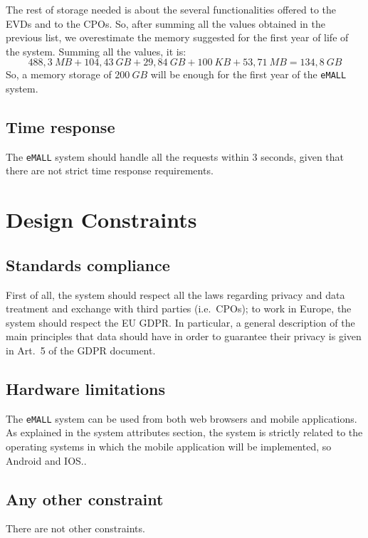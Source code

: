 The rest of storage needed is about the several functionalities offered to the EVDs and to the CPOs.
So, after summing all the values obtained in the previous list, we overestimate the memory suggested for the first year
of life of the system.
Summing all the values, it is:
\[
    488,3\ MB + 104,43\ GB + 29,84\ GB + 100\ KB + 53,71\ MB = 134,8\ GB
\]
So, a memory storage of $200\ GB$ will be enough for the first year of the \verb|eMALL| system.

\subsection*{Time response}
The \verb|eMALL| system should handle all the requests within 3 seconds, given that there are not strict time response requirements.

\newpage


\section{Design Constraints}
\label{sec:design_constraints}%

\subsection{Standards compliance}
\label{subsec:standards_compliance}%
First of all, the system should respect all the laws regarding privacy and data treatment and exchange with third parties (i.e.\ CPOs);
to work in Europe, the system should respect the EU GDPR\@.
In particular, a general description of the main principles that data should have in order to guarantee their privacy
is given in Art.\ 5 of the GDPR document.

\subsection{Hardware limitations}
\label{subsec:hardware_limitations}%
The \verb|eMALL| system can be used from both web browsers and mobile applications.
As explained in the system attributes section, the system is strictly related to the operating systems
in which the mobile application will be implemented, so Android and IOS\@..

\subsection{Any other constraint}
\label{subsec:any_other_constraint}%
There are not other constraints.


